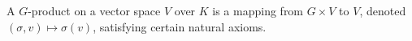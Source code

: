 A $G$-product on a vector space $V$ over $K$ is a mapping from $G \times V$ to $V$, denoted $(\sigma, v) \mapsto \sigma(v)$, satisfying certain natural axioms.
